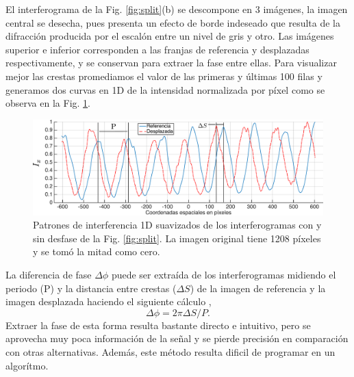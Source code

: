 El interferograma de la Fig. \ref{fig:split}(b) se descompone en 3
imágenes, la imagen central se desecha, pues presenta un efecto de
borde indeseado que resulta de la difracción producida por el escalón
entre un nivel de gris y otro. Las imágenes superior e inferior corresponden a las franjas
de referencia y desplazadas respectivamente, y se conservan para
extraer la fase entre ellas. 
Para visualizar mejor las crestas
promediamos el valor de las primeras y últimas 100 filas y generamos
dos curvas en 1D de la intensidad normalizada por píxel como se
observa en la Fig. \ref{fig:fringes_plot}.  
\begin{figure}[h!]
\centering
\includegraphics[scale=0.4]{fringes_plot_edited.pdf}
\caption[Patrones de interferencia 1D de interferogramas con y sin
desfase]{Patrones de interferencia 1D suavizados de los interferogramas con y sin
  desfase de la Fig. \ref{fig:split}. La imagen original tiene 1208
  píxeles y se tomó la mitad como cero.}
\label{fig:fringes_plot}
\end{figure}
La diferencia de fase $\Delta\phi$ puede ser extraída de los
interferogramas midiendo el periodo (P) y la distancia entre crestas ($\Delta S$) de la imagen de
referencia y la imagen desplazada haciendo el siguiente cálculo ,
$$\Delta\phi = 2\pi \Delta S/P.$$
Extraer la fase de esta forma resulta bastante directo e intuitivo,
pero se aprovecha muy poca información de la señal y se pierde
precisión en comparación con otras alternativas. Además, este método resulta dificil de
programar en un algorítmo. 

